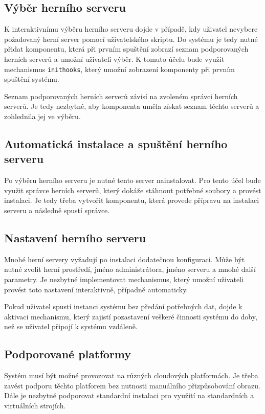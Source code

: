 \subsection{Výběr herního serveru}

K interaktivnímu výběru herního serveru dojde v případě, kdy uživatel nevybere požadovaný herní server pomocí uživatelského skriptu.
Do systému je tedy nutné přidat komponentu, která při prvním spuštění zobrazí seznam podporovaných herních serverů a umožní uživateli výběr.
K tomuto účelu bude využit mechanismus \texttt{inithooks}, který umožní zobrazení komponenty při prvním spuštění systému.

Seznam podporovaných herních serverů závisí na zvoleném správci herních serverů. Je tedy nezbytné, aby komponenta uměla získat seznam těchto serverů
a zohlednila jej ve výběru.

\subsection{Automatická instalace a spuštění herního serveru}

Po výběru herního serveru je nutné tento server nainstalovat. Pro tento účel bude využit správce herních serverů, který dokáže stáhnout potřebné soubory
a provést instalaci. Je tedy třeba vytvořit komponentu, která provede přípravu na instalaci serveru a následně spustí správce.

\subsection{Nastavení herního serveru}

Mnohé herní servery vyžadují po instalaci dodatečnou konfiguraci. Může být nutné zvolit herní prostředí, jméno administrátora, jméno serveru a mnohé další parametry.
Je nezbytné implementovat mechanismus, který umožní uživateli provést toto nastavení interaktivně, případně automaticky.

Pokud uživatel spustí instanci systému bez předání potřebných dat, dojde k aktivaci mechanismu, který zajistí pozastavení veškeré činnosti systému do doby, než
se uživatel připojí k systému vzdáleně.

\subsection{Podporované platformy}

Systém musí být možné provozovat na různých cloudových platformách. Je třeba zavést podporu těchto platforem bez nutnosti manuálního přizpůsobování obrazu.
Dále je nezbytné podporovat standardní instalaci pro využití na standardních a virtuálních strojích.

